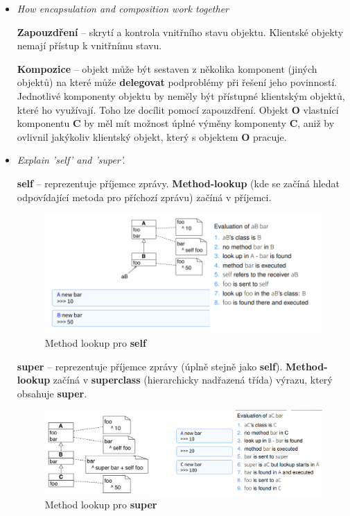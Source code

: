 \documentclass{szzclass}
\begin{document}
\begin{itemize}
      \item \textit{How encapsulation and composition work together}
      
      \textbf{Zapouzdření} -- skrytí a kontrola vnitřního stavu objektu. Klientské objekty nemají přístup
      k vnitřnímu stavu.

      \textbf{Kompozice} -- objekt může být sestaven z několika komponent (jiných objektů) na které může
      \textbf{delegovat} podproblémy při řešení jeho povinností. Jednotlivé komponenty objektu by neměly být
      přístupné klientským objektů, které ho využívají. Toho lze docílit pomocí zapouzdření.
      Objekt \textbf{O} vlastnící komponentu \textbf{C} by měl mít možnost úplné výměny komponenty \textbf{C},
      aniž by ovlivnil jakýkoliv klientský objekt, který s objektem \textbf{O} pracuje.
      
      \item \textit{Explain 'self' and 'super'.}
      
      \textbf{self} -- reprezentuje příjemce zprávy. \textbf{Method-lookup} (kde se začíná hledat odpovídající
      metoda pro příchozí zprávu) začíná v příjemci.

      \begin{figure}[h]
            \centering
            \includegraphics[width=1\textwidth]{topics/bi-wsi-si-09/self.png}
            \caption{Method lookup pro \textbf{self}}
      \end{figure}

      \textbf{super} -- reprezentuje příjemce zprávy (úplně stejně jako \textbf{self}). \textbf{Method-lookup}
      začíná v \textbf{superclass} (hierarchicky nadřazená třída) výrazu, který obsahuje \textbf{super}.

      \begin{figure}[h]
            \centering
            \includegraphics[width=1\textwidth]{topics/bi-wsi-si-09/super.png}
            \caption{Method lookup pro \textbf{super}}
      \end{figure}
      

\end{itemize}
\end{document}
